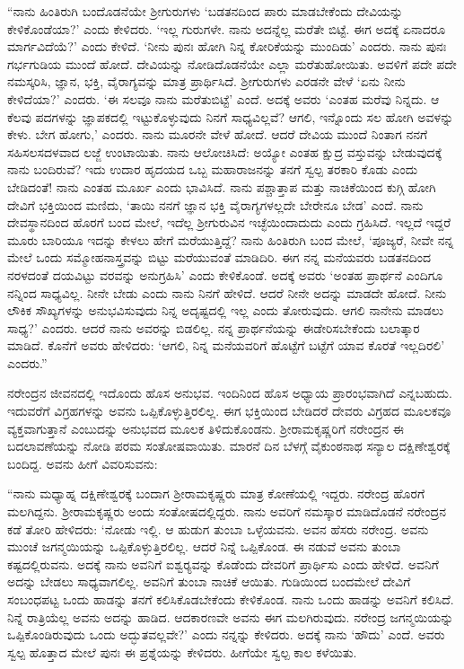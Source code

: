 “ನಾನು ಹಿಂತಿರುಗಿ ಬಂದೊಡನೆಯೇ ಶ‍್ರೀಗುರುಗಳು ‘ಬಡತನದಿಂದ ಪಾರು ಮಾಡಬೇಕೆಂದು ದೇವಿಯನ್ನು ಕೇಳಿಕೊಂಡೆಯಾ?’ ಎಂದು ಕೇಳಿದರು. ‘ಇಲ್ಲ ಗುರುಗಳೇ. ನಾನು ಅದನ್ನೆಲ್ಲ ಮರೆತೇ ಬಿಟ್ಟೆ. ಈಗ ಅದಕ್ಕೆ ಏನಾದರೂ ಮಾರ್ಗವಿದೆಯೆ?’ ಎಂದು ಕೇಳಿದೆ. ‘ನೀನು ಪುನಃ ಹೋಗಿ ನಿನ್ನ ಕೋರಿಕೆಯನ್ನು ಮುಂದಿಡು’ ಎಂದರು. ನಾನು ಪುನಃ ಗರ್ಭಗುಡಿಯ ಮುಂದೆ ಹೋದೆ. ದೇವಿಯನ್ನು ನೋಡಿದೊಡನೆಯೇ ಎಲ್ಲಾ ಮರೆತುಹೋಯಿತು. ಅವಳಿಗೆ ಪದೇ ಪದೇ ನಮಸ್ಕರಿಸಿ, ಜ್ಞಾನ, ಭಕ್ತಿ, ವೈರಾಗ್ಯವನ್ನು ಮಾತ್ರ ಪ್ರಾರ್ಥಿಸಿದೆ. ಶ‍್ರೀಗುರುಗಳು ಎರಡನೇ ವೇಳೆ ‘ಏನು ನೀನು ಕೇಳಿದೆಯಾ?’ ಎಂದರು. ‘ಈ ಸಲವೂ ನಾನು ಮರೆತುಬಿಟ್ಟೆ’ ಎಂದೆ. ಅದಕ್ಕೆ ಅವರು ‘ಎಂತಹ ಮರೆವು ನಿನ್ನದು. ಆ ಕೆಲವು ಪದಗಳನ್ನು ಜ್ಞಾಪಕದಲ್ಲಿ ಇಟ್ಟುಕೊಳ್ಳುವುದು ನಿನಗೆ ಸಾಧ್ಯವಿಲ್ಲವೆ? ಆಗಲಿ, ಇನ್ನೊಂದು ಸಲ ಹೋಗಿ ಅವಳನ್ನು ಕೇಳು. ಬೇಗ ಹೋಗು,’ ಎಂದರು. ನಾನು ಮೂರನೇ ವೇಳೆ ಹೋದೆ. ಆದರೆ ದೇವಿಯ ಮುಂದೆ ನಿಂತಾಗ ನನಗೆ ಸಹಿಸಲಸದಳವಾದ ಲಜ್ಜೆ ಉಂಟಾಯಿತು. ನಾನು ಆಲೋಚಿಸಿದೆ: ಅಯ್ಯೋ ಎಂತಹ ಕ್ಷುದ್ರ ವಸ್ತುವನ್ನು ಬೇಡುವುದಕ್ಕೆ ನಾನು ಬಂದಿರುವೆ? ಇದು ಉದಾರ ಹೃದಯದ ಒಬ್ಬ ಮಹಾರಾಜನನ್ನು ತನಗೆ ಸ್ವಲ್ಪ ತರಕಾರಿ ಕೊಡು ಎಂದು ಬೇಡಿದಂತೆ! ನಾನು ಎಂತಹ ಮೂರ್ಖ ಎಂದು ಭಾವಿಸಿದೆ. ನಾನು ಪಶ್ಚಾತ್ತಾಪ ಮತ್ತು ನಾಚಿಕೆಯಿಂದ ಕುಗ್ಗಿ ಹೋಗಿ ದೇವಿಗೆ ಭಕ್ತಿಯಿಂದ ಮಣಿದು, ‘ತಾಯಿ ನನಗೆ ಜ್ಞಾನ ಭಕ್ತಿ ವೈರಾಗ್ಯಗಳಲ್ಲದೇ ಬೇರೇನೂ ಬೇಡ’ ಎಂದೆ. ನಾನು ದೇವಸ್ಥಾನದಿಂದ ಹೊರಗೆ ಬಂದ ಮೇಲೆ, ಇದೆಲ್ಲ ಶ‍್ರೀಗುರುವಿನ ಇಚ್ಛೆಯಿಂದಾದುದು ಎಂದು ಗ್ರಹಿಸಿದೆ. ಇಲ್ಲದೆ ಇದ್ದರೆ ಮೂರು ಬಾರಿಯೂ ಇದನ್ನು ಕೇಳಲು ಹೇಗೆ ಮರೆಯುತ್ತಿದ್ದೆ? ನಾನು ಹಿಂತಿರುಗಿ ಬಂದ ಮೇಲೆ, ‘ಪೂಜ್ಯರೆ, ನೀವೇ ನನ್ನ ಮೇಲೆ ಒಂದು ಸಮ್ಮೋಹನಾಸ್ತ್ರವನ್ನು ಬಿಟ್ಟು ಮರೆಯುವಂತೆ ಮಾಡಿದಿರಿ. ಈಗ ನನ್ನ ಮನೆಯವರು ಬಡತನದಿಂದ ನರಳದಂತೆ ದಯವಿಟ್ಟು ವರವನ್ನು ಅನುಗ್ರಹಿಸಿ’ ಎಂದು ಕೇಳಿಕೊಂಡೆ. ಅದಕ್ಕೆ ಅವರು ‘ಅಂತಹ ಪ್ರಾರ್ಥನೆ ಎಂದಿಗೂ ನನ್ನಿಂದ ಸಾಧ್ಯವಿಲ್ಲ. ನೀನೇ ಬೇಡು ಎಂದು ನಾನು ನಿನಗೆ ಹೇಳಿದೆ. ಆದರೆ ನೀನೇ ಅದನ್ನು ಮಾಡದೇ ಹೋದೆ. ನೀನು ಲೌಕಿಕ ಸೌಖ್ಯಗಳನ್ನು ಅನುಭವಿಸುವುದು ನಿನ್ನ ಅದೃಷ್ಟದಲ್ಲಿ ಇಲ್ಲ ಎಂದು ತೋರುವುದು. ಆಗಲಿ ನಾನೇನು ಮಾಡಲು ಸಾಧ್ಯ?’ ಎಂದರು. ಆದರೆ ನಾನು ಅವರನ್ನು ಬಿಡಲಿಲ್ಲ. ನನ್ನ ಪ್ರಾರ್ಥನೆಯನ್ನು ಈಡೇರಿಸಬೇಕೆಂದು ಬಲಾತ್ಕಾರ ಮಾಡಿದೆ. ಕೊನೆಗೆ ಅವರು ಹೇಳಿದರು: ‘ಆಗಲಿ, ನಿನ್ನ ಮನೆಯವರಿಗೆ ಹೊಟ್ಟೆಗೆ ಬಟ್ಟೆಗೆ ಯಾವ ಕೊರತೆ ಇಲ್ಲದಿರಲಿ’ ಎಂದರು.”

\newpage

ನರೇಂದ್ರನ ಜೀವನದಲ್ಲಿ ಇದೊಂದು ಹೊಸ ಅನುಭವ. ಇಂದಿನಿಂದ ಹೊಸ ಅಧ್ಯಾಯ ಪ್ರಾರಂಭವಾಗಿದೆ ಎನ್ನಬಹುದು. ಇದುವರೆಗೆ ವಿಗ್ರಹಗಳನ್ನು ಅವನು ಒಪ್ಪಿಕೊಳ್ಳುತ್ತಿರಲಿಲ್ಲ. ಈಗ ಭಕ್ತಿಯಿಂದ ಬೇಡಿದರೆ ದೇವರು ವಿಗ್ರಹದ ಮೂಲಕವೂ ವ್ಯಕ್ತವಾಗುತ್ತಾನೆ ಎಂಬುದನ್ನು ಅನುಭವದ ಮೂಲಕ ತಿಳಿದುಕೊಂಡನು. ಶ‍್ರೀರಾಮಕೃಷ್ಣರಿಗೆ ನರೇಂದ್ರನ ಈ ಬದಲಾವಣೆಯನ್ನು ನೋಡಿ ಪರಮ ಸಂತೋಷವಾಯಿತು. ಮಾರನೆ ದಿನ ಬೆಳಗ್ಗೆ ವೈಕುಂಠನಾಥ ಸನ್ಯಾಲ ದಕ್ಷಿಣೇಶ್ವರಕ್ಕೆ ಬಂದಿದ್ದ. ಅವನು ಹೀಗೆ ವಿವರಿಸುವನು:

“ನಾನು ಮಧ್ಯಾಹ್ನ ದಕ್ಷಿಣೇಶ್ವರಕ್ಕೆ ಬಂದಾಗ ಶ‍್ರೀರಾಮಕೃಷ್ಣರು ಮಾತ್ರ ಕೋಣೆಯಲ್ಲಿ ಇದ್ದರು. ನರೇಂದ್ರ ಹೊರಗೆ ಮಲಗಿದ್ದನು. ಶ‍್ರೀರಾಮಕೃಷ್ಣರು ಅಂದು ಸಂತೋಷದಲ್ಲಿದ್ದರು. ನಾನು ಅವರಿಗೆ ನಮಸ್ಕಾರ ಮಾಡಿದೊಡನೆ ನರೇಂದ್ರನ ಕಡೆ ತೋರಿ ಹೇಳಿದರು: ‘ನೋಡು ಇಲ್ಲಿ. ಆ ಹುಡುಗ ತುಂಬಾ ಒಳ್ಳೆಯವನು. ಅವನ ಹೆಸರು ನರೇಂದ್ರ. ಅವನು ಮುಂಚೆ ಜಗನ್ಮಯಿಯನ್ನು ಒಪ್ಪಿಕೊಳ್ಳುತ್ತಿರಲಿಲ್ಲ. ಆದರೆ ನಿನ್ನೆ ಒಪ್ಪಿಕೊಂಡ. ಈ ನಡುವೆ ಅವನು ತುಂಬಾ ಕಷ್ಟದಲ್ಲಿರುವನು. ಅದಕ್ಕೆ ನಾನು ಅವನಿಗೆ ಐಶ್ವರ‍್ಯವನ್ನು ಕೊಡೆಂದು ದೇವರಿಗೆ ಪ್ರಾರ್ಥಿಸು ಎಂದು ಹೇಳಿದೆ. ಅವನಿಗೆ ಅದನ್ನು ಬೇಡಲು ಸಾಧ್ಯವಾಗಲಿಲ್ಲ. ಅವನಿಗೆ ತುಂಬಾ ನಾಚಿಕೆ ಆಯಿತು. ಗುಡಿಯಿಂದ ಬಂದಮೇಲೆ ದೇವಿಗೆ ಸಂಬಂಧಪಟ್ಟ ಒಂದು ಹಾಡನ್ನು ತನಗೆ ಕಲಿಸಿಕೊಡಬೇಕೆಂದು ಕೇಳಿಕೊಂಡ. ನಾನು ಒಂದು ಹಾಡನ್ನು ಅವನಿಗೆ ಕಲಿಸಿದೆ. ನಿನ್ನೆ ರಾತ್ರಿಯೆಲ್ಲ ಅವನು ಅದನ್ನು ಹಾಡಿದ. ಆದಕಾರಣವೇ ಅವನು ಈಗ ಮಲಗಿರುವುದು. ನರೇಂದ್ರ ಜಗನ್ಮಯಿಯನ್ನು ಒಪ್ಪಿಕೊಂಡಿರುವುದು ಒಂದು ಅದ್ಭುತವಲ್ಲವೇ?’ ಎಂದು ನನ್ನನ್ನು ಕೇಳಿದರು. ಅದಕ್ಕೆ ನಾನು ‘ಹೌದು’ ಎಂದೆ. ಅವರು ಸ್ವಲ್ಪ ಹೊತ್ತಾದ ಮೇಲೆ ಪುನಃ ಈ ಪ್ರಶ್ನೆಯನ್ನು ಕೇಳಿದರು. ಹೀಗೆಯೇ ಸ್ವಲ್ಪ ಕಾಲ ಕಳೆಯಿತು.


